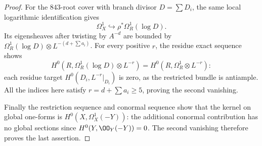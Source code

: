 \begin{proof}
For the $843$-root cover with branch divisor $D=\sum D_i$, the same local logarithmic identification gives
\[
 \Omega_X^1\hookrightarrow\rho^*\Omega_R^1(\log D).
\]
Its eigensheaves after twisting by $A^{-d}$ are bounded by
$\Omega_R^1(\log D)\otimes L^{-(d+\sum a_i)}$.
For every positive $r$, the residue exact sequence shows
\[
 H^0(R,\Omega_R^1(\log D)\otimes L^{-r})
     =H^0(R,\Omega_R^1\otimes L^{-r}):
\]
each residue target $H^0(D_i,L^{-r}|_{D_i})$ is zero, as the restricted bundle is antiample.  All the indices here satisfy $r=d+\sum a_i\geq5$, proving the second vanishing.

Finally the restriction sequence and conormal sequence show that the kernel on global one-forms is $H^0(X,\Omega_X^1(-Y))$: the additional conormal contribution has no global sections since
$H^0(Y,\OO_Y(-Y))=0$.  The second vanishing therefore proves the last assertion.
\end{proof}

